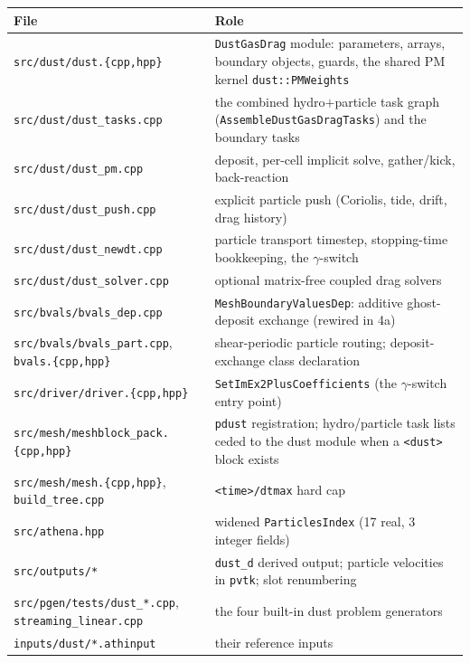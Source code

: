 \documentclass[11pt]{article}
\newcommand{\code}[1]{\texttt{#1}}
\newcommand{\file}[1]{\texttt{\small #1}}
\newcommand{\fn}[1]{\texttt{\small #1}}
\begin{document}
\begin{center}
\small
\begin{tabular}{@{}>{\raggedright\arraybackslash}p{6.6cm}>{\raggedright\arraybackslash}p{9.2cm}@{}}
\toprule
File & Role \\
\midrule
\file{src/dust/dust.\{cpp,hpp\}} & \code{DustGasDrag} module: parameters, arrays,
  boundary objects, guards, the shared PM kernel \fn{dust::PMWeights} \\
\file{src/dust/dust\_tasks.cpp} & the combined hydro$+$particle task graph
  (\fn{AssembleDustGasDragTasks}) and the boundary tasks \\
\file{src/dust/dust\_pm.cpp} & deposit, per-cell implicit solve, gather/kick, back-reaction \\
\file{src/dust/dust\_push.cpp} & explicit particle push (Coriolis, tide, drift, drag history) \\
\file{src/dust/dust\_newdt.cpp} & particle transport timestep, stopping-time bookkeeping,
  the $\gamma$-switch \\
\file{src/dust/dust\_solver.cpp} & optional matrix-free coupled drag solvers \\
\file{src/bvals/bvals\_dep.cpp} & \code{MeshBoundaryValuesDep}: additive ghost-deposit
  exchange (rewired in 4a) \\
\file{src/bvals/bvals\_part.cpp}, \file{bvals.\{cpp,hpp\}} & shear-periodic particle
  routing; deposit-exchange class declaration \\
\file{src/driver/driver.\{cpp,hpp\}} & \fn{SetImEx2PlusCoefficients} (the $\gamma$-switch
  entry point) \\
\file{src/mesh/meshblock\_pack.\{cpp,hpp\}} & \code{pdust} registration; hydro/particle
  task lists ceded to the dust module when a \code{<dust>} block exists \\
\file{src/mesh/mesh.\{cpp,hpp\}}, \file{build\_tree.cpp} & \code{<time>/dtmax} hard cap \\
\file{src/athena.hpp} & widened \code{ParticlesIndex} (17 real, 3 integer fields) \\
\file{src/outputs/*} & \code{dust\_d} derived output; particle velocities in \code{pvtk};
  slot renumbering \\
\file{src/pgen/tests/dust\_*.cpp}, \file{streaming\_linear.cpp} & the four built-in dust
  problem generators \\
\file{inputs/dust/*.athinput} & their reference inputs \\
\bottomrule
\end{tabular}
\end{center}
\end{document}
